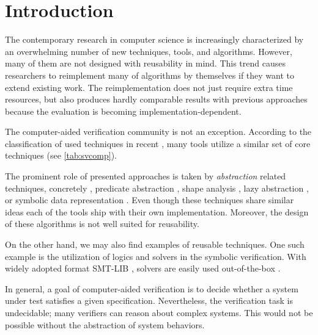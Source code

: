 \chapter{Introduction}
\label{ch:intro}


The contemporary research in computer science is increasingly characterized by
an overwhelming number of new techniques, tools, and algorithms.  However, many
of them are not designed with reusability in mind.  This trend causes
researchers to reimplement many of algorithms by themselves if they want to
extend existing work.  The reimplementation does not just require extra time
resources, but also produces hardly comparable results with previous approaches
because the evaluation is becoming implementation-dependent.

The computer-aided verification community is not an exception.
According to the classification of used techniques in recent \svcomp \cite{SVCOMP2019}, many tools utilize a similar set of core techniques (see \autoref{tab:svcomp}).


The prominent role of presented approaches is taken by \emph{abstraction} related techniques, concretely \cegar
\cite{Clarke20}, predicate abstraction \cite{Flanagan02}, shape analysis \cite{Yang2008}, lazy abstraction \cite{Henzinger2002}, or symbolic data representation \cite{King76,Burch1990,Majumdar2018}.
Even though these techniques share similar ideas each of the tools ship with their own implementation.
Moreover, the design of these algorithms is not well suited for reusability.


On the other hand, we may also find examples of reusable techniques.  One such
example is the utilization of \smt logics and solvers in the symbolic
verification.  With widely adopted format SMT-LIB \cite{Barrett2010}, \smt
solvers are easily used out-of-the-box \cite{Dutertre2006, DeMoura2008, Barrett2011, Corzilius2015}.

In general, a goal of computer-aided verification is to decide whether a system
under test satisfies a given specification.  Nevertheless, the verification
task is undecidable; many verifiers can reason about complex systems. This
would not be possible without the abstraction of system behaviors.

